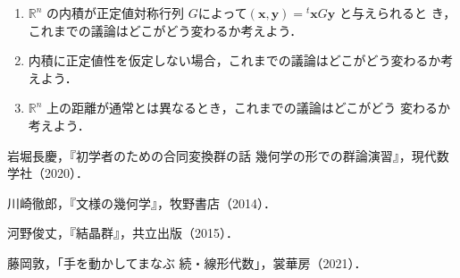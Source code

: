 \documentclass[11pt, uplatex, dvipdfmx, titlepage]{jsarticle}
\theoremstyle{definition}
\begin{document}
\begin{enumerate}
\item $\mathbb{R}^n$ の内積が正定値対称行列
  $G$によって$(\bm{x}, \bm{y}) = {}^{t} \bm{x} G \bm{y}$ と与えられると
  き，これまでの議論はどこがどう変わるか考えよう．

\item 内積に正定値性を仮定しない場合，これまでの議論はどこがどう変わるか考えよう．
  
\item $\mathbb{R}^n$ 上の距離が通常とは異なるとき，これまでの議論はどこがどう
  変わるか考えよう．

\end{enumerate}

\begin{thebibliography}{99}
 岩堀長慶，『初学者のための合同変換群の話 幾何学の形での群論演習』，現代数学社（2020）．

 川崎徹郎，『文様の幾何学』，牧野書店（2014）．

 河野俊丈，『結晶群』，共立出版（2015）．

 藤岡敦，「手を動かしてまなぶ 続・線形代数」，裳華房（2021）．
\end{thebibliography}
\end{document}
